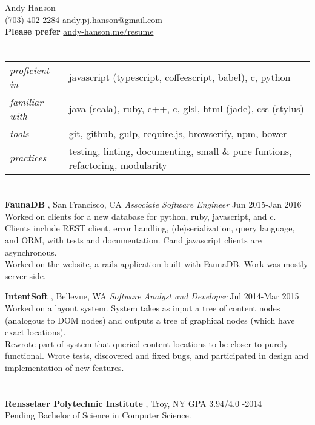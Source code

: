 \documentclass[margin]{res}
\newcommand{\sweetline}[1]{
	\setlength{\parskip}{1.5ex}
	\nointerlineskip
	\hspace{\fill}
	\resizebox{0.33\linewidth}{1.25ex}
	{
    	\begin{tikzpicture}
			\node (C) at (0,0) {};
			\node (D) at (9,0) {};
			\path (C) to [ornament=#1] (D);
		\end{tikzpicture}
	}
	\hspace{\fill}
	\par
	\nointerlineskip
}
\newcommand{\Sharp}{\nolinebreak\hspace{-.05em}\raisebox{.6ex}{\scriptsize\bf \#}}
\newcommand{\sex}[1]{\section{\fontsize{13}{13}\selectfont{#1}}}
\newcommand{\tit}[1]{{
	\fontsize{11}{12}
	\selectfont
	\textbf{#1}
}}
\newcommand{\vs}[0]{\vspace{2px}}
\begin{document}
{\centering
	\huge{Andy Hanson} \normalsize \\
	(703) 402-2284 \quad \url{andy.pj.hanson@gmail.com} \\
	\textbf{Please prefer} \url{andy-hanson.me/resume} \\
}


\begin{resume}


\sex{skill}
\begin{tabularx}{\textwidth}{ | l X }
	\emph{proficient in} & javascript (typescript, coffeescript, babel), c\Sharp, python \vs \\
	\emph{familiar with} & java (scala), ruby, c++, c, glsl, html (jade), css (stylus) \vs \\
	\emph{tools} & git, github, gulp, require.js, browserify, npm, bower \vs \\
	\emph{practices} & testing, linting, documenting, small \& pure funtions, refactoring, modularity
\end{tabularx}

\sex{work}
	\tit{FaunaDB}, San Francisco, CA \enspace \emph{Associate Software Engineer} \hfill \textsf{Jun 2015-Jan 2016} \\
	Worked on clients for a new database for python, ruby, javascript, and c\Sharp. \\
	Clients include REST client, error handling, (de)serialization, query language, and ORM, with tests and documentation.
	C\Sharp and javascript clients are asynchronous. \\
	Worked on the website, a rails application built with FaunaDB. Work was mostly server-side.
	
	\tit{IntentSoft}, Bellevue, WA \enspace \emph{Software Analyst and Developer} \hfill \textsf{Jul 2014-Mar 2015} \\
	Worked on a layout system. System takes as input a tree of content nodes (analogous to DOM nodes) and outputs a tree of graphical nodes (which have exact locations). \\
	Rewrote part of system that queried content locations to be closer to purely functional.
	Wrote tests, discovered and fixed bugs, and participated in design and implementation of new features.

\sex{school}
	\tit{Rensselaer Polytechnic Institute}, Troy, NY \hfill \textsf{GPA 3.94/4.0 -2014} \\
	Pending Bachelor of Science in Computer Science.


\end{resume}
\end{document}
